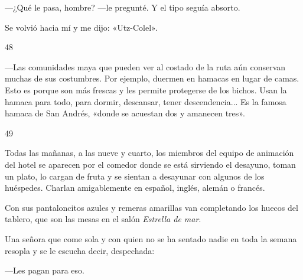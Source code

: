 \documentclass[12pt,twoside,openright,a5paper]{book}
\begin{document}
---¿Qué le pasa, hombre? ---le pregunté. Y el tipo seguía
absorto.

Se volvió hacia mí y me dijo: «Utz-Colel».

\vspace{0.5cm}

\hrulefill \hspace{0.1cm}\decofourleft\hspace{0.2cm} 48 \hspace{0.2cm}\decofourright \hspace{0.1cm}\hrulefill

\nopagebreak

\vspace{0.5cm}

\nopagebreak

---Las comunidades maya que pueden ver al costado de la ruta aún conservan
muchas de sus costumbres. Por ejemplo, duermen en hamacas en lugar de
camas. Esto es porque son más frescas y les permite protegerse de los bichos. Usan la hamaca
para todo, para dormir, descansar, tener descendencia... Es la famosa hamaca de
San Andrés, «donde se acuestan dos y amanecen tres».

\vspace{0.5cm}

\hrulefill \hspace{0.1cm}\decofourleft\hspace{0.2cm} 49 \hspace{0.2cm}\decofourright \hspace{0.1cm}\hrulefill

\nopagebreak

\vspace{0.5cm}

\nopagebreak

Todas las mañanas, a las nueve y cuarto, los miembros del equipo de animación del
hotel se aparecen por el comedor donde se está sirviendo el desayuno, toman
un plato, lo cargan de fruta y se sientan a desayunar con algunos de los
huéspedes. Charlan amigablemente en español, inglés, alemán o francés.

Con sus pantaloncitos azules y remeras amarillas van completando los huecos
del tablero, que son las mesas en el salón \emph{Estrella de mar}.

Una señora que come sola y con quien no se ha sentado nadie en toda la
semana resopla y se le escucha decir, despechada:

---Les pagan para eso.

\vspace{0.5cm}
\end{document}
